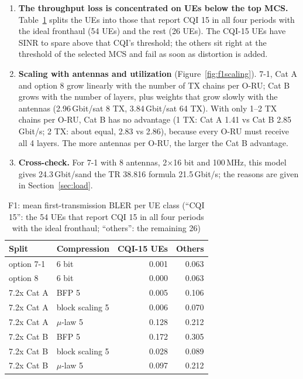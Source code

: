 \documentclass[11pt,a4paper]{article}
\newcommand{\Gbps}{\,Gbit/s}
\begin{document}
\begin{enumerate}
\begin{itemize}
                NZP-IMR, so the MCS is lowered somewhat;
          \item among the 5-bit methods, $\mu$-law is the worst in Cat A (85\% throughput) and block scaling the best (97\% / 96\%),
                at the same number of bits.
        \end{itemize}
  \item \textbf{The throughput loss is concentrated on UEs below the top MCS.} Table~\ref{tab:f1ue} splits the UEs into those
        that report CQI 15 in all four periods with the ideal fronthaul (54 UEs) and the rest (26 UEs). The CQI-15 UEs have SINR
        to spare above that CQI's threshold; the others sit right at the threshold of the selected MCS and fail as soon as
        distortion is added.
  \item \textbf{Scaling with antennas and utilization} (Figure~\ref{fig:f1scaling}). 7-1, Cat A and option 8 grow linearly with
        the number of TX chains per O-RU; Cat B grows with the number of layers, plus weights that grow slowly with the antennas
        (2.96\Gbps at 8 TX, 3.84\Gbps at 64 TX). With only 1--2 TX chains per O-RU, Cat B has no advantage (1 TX: Cat A 1.41 vs
        Cat B 2.85\Gbps; 2 TX: about equal, 2.83 vs 2.86), because every O-RU must receive all 4 layers. The more antennas per
        O-RU, the larger the Cat B advantage.
  \item \textbf{Cross-check.} For 7-1 with 8 antennas, 2$\times$16 bit and 100\,MHz, this model gives 24.3\Gbps and the TR 38.816
        formula 21.5\Gbps; the reasons are given in Section~\ref{sec:load}.
\end{enumerate}

\begin{table}[H]
\centering
\caption{F1: mean first-transmission BLER per UE class (``CQI 15'': the 54 UEs that report CQI 15 in all four periods with the
ideal fronthaul; ``others'': the remaining 26)}
\label{tab:f1ue}
\footnotesize
\begin{tabular}{@{}l l r r@{}}
\toprule
Split & Compression & CQI-15 UEs & Others \\
\midrule
option 7-1 & 6 bit             & 0.001 & 0.063 \\
option 8   & 6 bit             & 0.000 & 0.063 \\
7.2x Cat A & BFP 5             & 0.005 & 0.106 \\
7.2x Cat A & block scaling 5   & 0.006 & 0.070 \\
7.2x Cat A & $\mu$-law 5       & 0.128 & 0.212 \\
7.2x Cat B & BFP 5             & 0.172 & 0.305 \\
7.2x Cat B & block scaling 5   & 0.028 & 0.089 \\
7.2x Cat B & $\mu$-law 5       & 0.097 & 0.212 \\
\bottomrule
\end{tabular}
\end{table}
\end{document}
